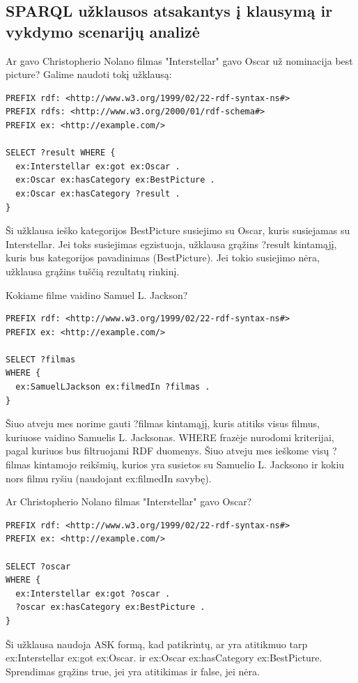 \documentclass{VUMIFPSkursinis}
\begin{document}
\subsection{SPARQL užklausos atsakantys į klausymą ir vykdymo scenarijų analizė}
Ar gavo Christopherio Nolano filmas "Interstellar" gavo Oscar už nominacija best picture?
Galime naudoti tokį užklausą:
\begin{lstlisting}[captionpos=b, caption=Užklausa 1, label=lst:sparql,
   basicstyle=\ttfamily,frame=single]
PREFIX rdf: <http://www.w3.org/1999/02/22-rdf-syntax-ns#>
PREFIX rdfs: <http://www.w3.org/2000/01/rdf-schema#>
PREFIX ex: <http://example.com/>

SELECT ?result WHERE {
  ex:Interstellar ex:got ex:Oscar .
  ex:Oscar ex:hasCategory ex:BestPicture .
  ex:Oscar ex:hasCategory ?result .
}

\end{lstlisting}

Ši užklausa ieško kategorijos BestPicture susiejimo su Oscar, kuris susiejamas su Interstellar. Jei toks susiejimas egzistuoja, užklausa grąžins ?result kintamąjį, kuris bus kategorijos pavadinimas (BestPicture). Jei tokio susiejimo nėra, užklausa grąžins tuščią rezultatų rinkinį.
\pagebreak

Kokiame filme vaidino Samuel L. Jackson?
\begin{lstlisting}[captionpos=b, caption=Užklausa 2, label=lst:sparql,
   basicstyle=\ttfamily,frame=single]
PREFIX rdf: <http://www.w3.org/1999/02/22-rdf-syntax-ns#>
PREFIX ex: <http://example.com/>

SELECT ?filmas
WHERE {
  ex:SamuelLJackson ex:filmedIn ?filmas .
}
\end{lstlisting}

Šiuo atveju mes norime gauti ?filmas kintamąjį, kuris atitiks visus filmus, kuriuose vaidino Samuelis L. Jacksonas.
WHERE frazėje nurodomi kriterijai, pagal kuriuos bus filtruojami RDF duomenys. Šiuo atveju mes ieškome visų ?filmas kintamojo reikšmių, kurios yra susietos su Samuelio L. Jacksono ir kokiu nors filmu ryšiu (naudojant ex:filmedIn savybę).

Ar Christopherio Nolano filmas "Interstellar" gavo Oscar?
\begin{lstlisting}[captionpos=b, caption=Užklausa 3, label=lst:sparql,
   basicstyle=\ttfamily,frame=single]
PREFIX rdf: <http://www.w3.org/1999/02/22-rdf-syntax-ns#>
PREFIX ex: <http://example.com/>

SELECT ?oscar
WHERE {
  ex:Interstellar ex:got ?oscar .
  ?oscar ex:hasCategory ex:BestPicture .
}

\end{lstlisting}
Ši užklausa naudoja ASK formą, kad patikrintų, ar yra atitikmuo tarp ex:Interstellar ex:got ex:Oscar. ir ex:Oscar ex:hasCategory ex:BestPicture. 
Sprendimas grąžins true, jei yra atitikimas ir false, jei nėra.
\end{document}
